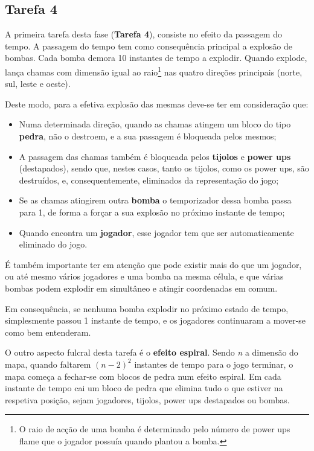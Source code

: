 \documentclass[a4paper]{article}
\begin{document}
\subsection{Tarefa 4}
\label{sec:problemaTarefa4}

A primeira tarefa desta fase (\textbf{Tarefa 4}), consiste no efeito da passagem
do tempo. A passagem do tempo tem como consequência principal a explosão 
de bombas. Cada bomba demora 10 instantes de tempo a explodir. Quando explode,
lança chamas com dimensão igual ao raio\footnote{O raio de acção de
  uma bomba é determinado pelo número de power ups flame que o jogador possuía quando plantou a bomba.} nas
quatro direções principais (norte, sul, leste e oeste).

Deste modo, para a efetiva explosão das mesmas deve-se ter em consideração que:

\begin{itemize} 
	\item Numa determinada direção, quando as chamas atingem um bloco do
	tipo \textbf{pedra}, não o destroem, e a sua passagem é bloqueada pelos mesmos;
	\item A passagem das chamas também é bloqueada pelos \textbf{tijolos} e \textbf{power ups} (destapados),
	sendo que, nestes casos, tanto os tijolos, como os power ups, são destruídos, e, 
	consequentemente, eliminados da representação do jogo;
	\item Se as chamas atingirem outra \textbf{bomba} o temporizador dessa bomba passa para 1,
	de forma a forçar a sua explosão no próximo instante de tempo;
	\item Quando encontra um \textbf{jogador}, esse jogador tem que ser automaticamente eliminado do jogo.
\end{itemize}

É também importante ter em atenção que pode existir mais do que um jogador, ou até mesmo 
vários jogadores e uma bomba na mesma célula, e que várias bombas podem explodir em simultâneo 
e atingir coordenadas em comum.

Em consequência, se nenhuma bomba explodir no próximo estado de tempo, simplesmente
passou 1 instante de tempo, e os jogadores continuaram a mover-se como bem entenderam.

O outro aspecto fulcral desta tarefa é o \textbf{efeito espiral}. Sendo \textit{n} a dimensão do mapa,
quando faltarem ${(n-2)^2}$ instantes de tempo para o jogo terminar, o mapa começa 
a fechar-se com blocos de pedra num efeito espiral. Em cada instante de tempo cai 
um bloco de pedra que elimina tudo o que estiver na respetiva posição, sejam jogadores, 
tijolos, power ups destapados ou bombas.
\end{document}
